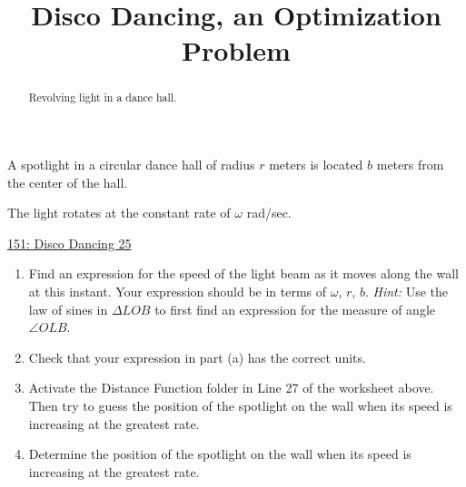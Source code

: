 \documentclass{ximera}
\title{Disco Dancing, an Optimization Problem}
\begin{document}
\begin{abstract}
Revolving light in a dance hall.
\end{abstract}
\maketitle

\begin{question}  \label{QdsadfKGDCCCC}
A spotlight in a circular dance hall of radius $r$ meters is located $b$ meters from the center of the hall. 

The light rotates at the constant rate of $\omega$ rad/sec. 

\begin{onlineOnly}
   \begin{center}
\end{center}
\end{onlineOnly}

\href{https://www.desmos.com/calculator/vtzsgtxswm}{151: Disco Dancing 25}


\begin{enumerate}
\item Find an expression for the speed of the light beam as it moves along the wall at this instant. Your expression should be in terms of $\omega$, $r$, $b$. \emph{Hint:} Use the law of sines in $\Delta LOB$ to first find an expression for the measure of angle $\angle OLB$.

\item Check that your expression in  part (a) has the correct units.

\item Activate the Distance Function folder in Line 27 of the worksheet above. Then try to guess the position of the spotlight on the wall when its speed is increasing at the greatest rate. 

\item Determine the position of the spotlight on the wall when its speed is increasing at the greatest rate.

\end{enumerate}

\end{question}


\end{document}
